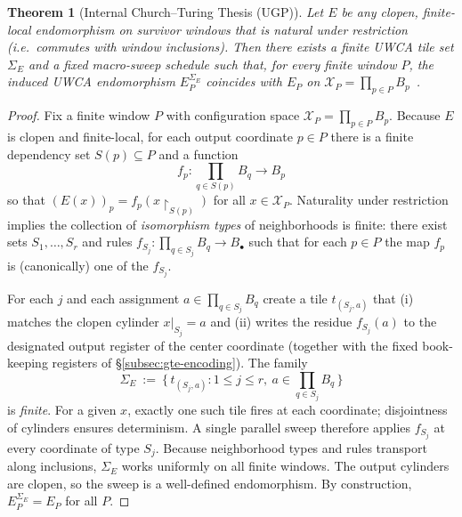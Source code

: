 \documentclass[12pt]{article}
\newtheorem{theorem}{Theorem}[section]
\numberwithin{equation}{section}
\begin{document}

\begin{theorem}[Internal Church--Turing Thesis (UGP)]\label{thm:ICT-UGP}
Let $E$ be any clopen, finite-local endomorphism on survivor windows that is natural under restriction (i.e.\ commutes with window inclusions). Then there exists a finite UWCA tile set $\Sigma_E$ and a fixed macro-sweep schedule such that, for every finite window $P$, the induced UWCA endomorphism $E^{\Sigma_E}_P$ coincides with $E_P$ on $\mathscr{X}_P=\prod_{p\in P}B_p$~\cite{SpivackUGPFormalization,ugp-lean}.
\end{theorem}

\begin{proof}
Fix a finite window $P$ with configuration space $\mathscr{X}_P=\prod_{p\in P}B_p$. Because $E$ is clopen and finite-local, for each output coordinate $p\in P$ there is a finite dependency set $S(p)\subseteq P$ and a function
\[
f_p:\prod_{q\in S(p)}B_q\to B_p
\]
so that $(E(x))_p=f_p\!\left(x\!\restriction_{S(p)}\right)$ for all $x\in\mathscr{X}_P$. Natural\-ity under restriction implies the collection of \emph{isomorphism types} of neighborhoods is finite: there exist sets $S_1,\dots,S_r$ and rules $f_{S_j}:\prod_{q\in S_j}B_q\to B_\bullet$ such that for each $p\in P$ the map $f_p$ is (canonically) one of the $f_{S_j}$.

For each $j$ and each assignment $a\in\prod_{q\in S_j}B_q$ create a tile $t_{(S_j,a)}$ that (i) matches the clopen cylinder $x|_{S_j}=a$ and (ii) writes the residue $f_{S_j}(a)$ to the designated output register of the center coordinate (together with the fixed book-keeping registers of \S\ref{subsec:gte-encoding}). The family
\[
\Sigma_E\ :=\ \big\{\,t_{(S_j,a)}:1\le j\le r,\ a\in\textstyle\prod_{q\in S_j}B_q\,\big\}
\]
is \emph{finite}. For a given $x$, exactly one such tile fires at each coordinate; disjointness of cylinders ensures determinism. A single parallel sweep therefore applies $f_{S_j}$ at every coordinate of type $S_j$. Because neighborhood types and rules transport along inclusions, $\Sigma_E$ works uniformly on all finite windows. The output cylinders are clopen, so the sweep is a well-defined endomorphism. By construction, $E^{\Sigma_E}_P=E_P$ for all $P$.
\end{proof}
\end{document}
